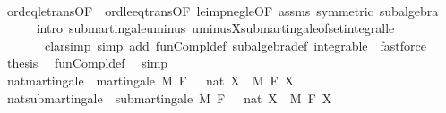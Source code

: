 \begin{isabellebody}
\ \ \ \ \isamarkupfalse%
\ ord{\isacharunderscore}{\kern0pt}eq{\isacharunderscore}{\kern0pt}le{\isacharunderscore}{\kern0pt}trans{\isacharbrackleft}{\kern0pt}OF\ {\isacharasterisk}{\kern0pt}\ ord{\isacharunderscore}{\kern0pt}le{\isacharunderscore}{\kern0pt}eq{\isacharunderscore}{\kern0pt}trans{\isacharbrackleft}{\kern0pt}OF\ le{\isacharunderscore}{\kern0pt}imp{\isacharunderscore}{\kern0pt}neg{\isacharunderscore}{\kern0pt}le{\isacharbrackleft}{\kern0pt}OF\ assms{\isacharparenleft}{\kern0pt}{}{\isacharparenright}{\kern0pt}{\isacharbrackright}{\kern0pt}\ {\isacharasterisk}{\kern0pt}{\isacharbrackleft}{\kern0pt}symmetric{\isacharbrackright}{\kern0pt}{\isacharbrackright}{\kern0pt}{\isacharbrackright}{\kern0pt}\ subalgebra\isanewline
\ \ \ \ \isamarkupfalse%
\ {\isacharparenleft}{\kern0pt}intro\ submartingale{\isachardot}{\kern0pt}uminus\ uminus{\isacharunderscore}{\kern0pt}X{\isachardot}{\kern0pt}submartingale{\isacharunderscore}{\kern0pt}of{\isacharunderscore}{\kern0pt}set{\isacharunderscore}{\kern0pt}integral{\isacharunderscore}{\kern0pt}le{\isacharparenright}{\kern0pt}\ \isanewline
\ \ \ \ \ \ \ {\isacharparenleft}{\kern0pt}clarsimp\ simp\ add{\isacharcolon}{\kern0pt}\ fun{\isacharunderscore}{\kern0pt}Compl{\isacharunderscore}{\kern0pt}def\ subalgebra{\isacharunderscore}{\kern0pt}def\ integrable\ {\isacharbar}{\kern0pt}\ fastforce{\isacharparenright}{\kern0pt}{\isacharplus}{\kern0pt}\isanewline
\ \ \isamarkupfalse%
\ {\isacharquery}{\kern0pt}thesis\ \isamarkupfalse%
\ fun{\isacharunderscore}{\kern0pt}Compl{\isacharunderscore}{\kern0pt}def\ \isamarkupfalse%
\ simp\isanewline
{}\isamarkupfalse%
%
\endisatagproof
{\isafoldproof}%
%
\isadelimproof
%
\endisadelimproof
%
\isadelimdocument
%
\endisadelimdocument
%
\isatagdocument
%
\isamarkuptrue%
%
\endisatagdocument
{\isafolddocument}%
%
\isadelimdocument
%
\endisadelimdocument
{}\isamarkupfalse%
\ nat{\isacharunderscore}{\kern0pt}martingale\ {\isacharequal}{\kern0pt}\ martingale\ M\ F\ {\isachardoublequoteopen}{}\ {\isacharcolon}{\kern0pt}{\isacharcolon}{\kern0pt}\ nat{\isachardoublequoteclose}\ X\ \ M\ F\ X\isanewline
{}\isamarkupfalse%
\ nat{\isacharunderscore}{\kern0pt}submartingale\ {\isacharequal}{\kern0pt}\ submartingale\ M\ F\ {\isachardoublequoteopen}{}\ {\isacharcolon}{\kern0pt}{\isacharcolon}{\kern0pt}\ nat{\isachardoublequoteclose}\ X\ \ M\ F\ X\isanewline

\end{isabellebody}

